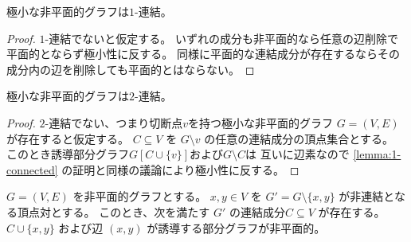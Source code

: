 


\begin{lemma}\label{lemma:1-connected}
極小な非平面的グラフは$1$-連結。
\end{lemma}

\begin{proof}
$1$-連結でないと仮定する。
いずれの成分も非平面的なら任意の辺削除で平面的とならず極小性に反する。
同様に平面的な連結成分が存在するならその成分内の辺を削除しても平面的とはならない。
\end{proof}


\begin{lemma}\label{lemma:2-connected}
極小な非平面的グラフは$2$-連結。
\end{lemma}

\begin{proof}
$2$-連結でない、つまり切断点$v$を持つ極小な非平面的グラフ $G=(V, E)$ が存在すると仮定する。
$C \subseteq V$ を $G \setminus v$ の任意の連結成分の頂点集合とする。
このとき誘導部分グラフ$G[C \cup \{v\}]$および$G \setminus C$は
互いに辺素なので
\cref{lemma:1-connected} の証明と同様の議論により極小性に反する。
\end{proof}



\begin{lemma}\label{lemma:edge_disconnected}
$G=(V, E)$ を非平面的グラフとする。
$x, y \in V$ を $G' = G \setminus \{x, y\}$ が非連結となる頂点対とする。
このとき、次を満たす $G'$ の連結成分$C \subseteq V$ が存在する。
$C \cup \{x, y\}$ および辺 $(x, y)$ が誘導する部分グラフが非平面的。
\end{lemma}

